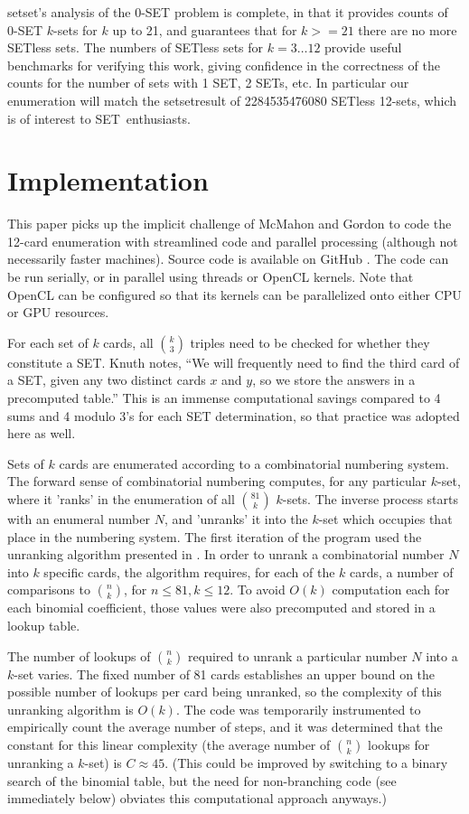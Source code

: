 \documentclass[10pt]{amsart}
\newcommand{\SETb}{SET\texttrademark\ } %
\newcommand{\SETSET}{{\sc setset}}
\begin{document}
\SETSET's analysis of the 0-SET problem is complete, in that it provides counts
of 0-SET $k$-sets for $k$ up to 21, and \cite{MAXCAP} guarantees that for
$k>=21$ there are no more SETless sets. The numbers of SETless sets for
$k=3\ldots 12$ provide useful benchmarks for verifying this work, giving
confidence in the correctness of the counts for the number of sets with 1 SET, 2
SETs, etc. In particular our enumeration will match the \SETSET result of
2284535476080 SETless 12-sets, which is of interest to \SETb enthusiasts.


\section{Implementation}
This paper picks up the implicit challenge of McMahon and Gordon to code the
12-card enumeration with streamlined code and parallel processing (although not
necessarily faster machines). Source code is available on GitHub \cite{ME}. The
code can be run serially, or in parallel using threads or OpenCL \cite{OPENCL}
kernels. Note that OpenCL can be configured so that its kernels can be
parallelized onto either CPU or GPU resources.

For each set of $k$ cards, all $\binom{k}{3}$ triples need to be checked for
whether they constitute a SET. Knuth notes, ``We will frequently need to find
the third card of a SET, given any two distinct cards $x$ and $y$, so we store
the answers in a precomputed table.''  This is an immense computational savings
compared to 4 sums and 4 modulo 3's for each SET determination, so that practice
was adopted here as well.

Sets of $k$ cards are enumerated according to a combinatorial numbering
system. The forward sense of combinatorial numbering computes, for any
particular $k$-set, where it 'ranks' in the enumeration of all $\binom{81}{k}$
$k$-sets. The inverse process starts with an enumeral number $N$, and 'unranks'
it into the $k$-set which occupies that place in the numbering system. The first
iteration of the program used the unranking algorithm presented in
\cite{WIKI}. In order to unrank a combinatorial number $N$ into $k$ specific
cards, the algorithm requires, for each of the $k$ cards, a number of
comparisons to $\binom{n}{k}$, for $n\le 81, k\le 12$. To avoid $O(k)$
computation each for each binomial coefficient, those values were also
precomputed and stored in a lookup table.

The number of lookups of $\binom{n}{k}$ required to unrank a particular number
$N$ into a $k$-set varies. The fixed number of 81 cards establishes an upper
bound on the possible number of lookups per card being unranked, so the
complexity of this unranking algorithm is $O(k)$. The code was temporarily
instrumented to empirically count the average number of steps, and it was
determined that the constant for this linear complexity (the average number of
$\binom{n}{k}$ lookups for unranking a $k$-set) is $C\approx 45$. (This could be
improved by switching to a binary search of the binomial table, but the need for
non-branching code (see immediately below) obviates this computational approach
anyways.)
\end{document}

